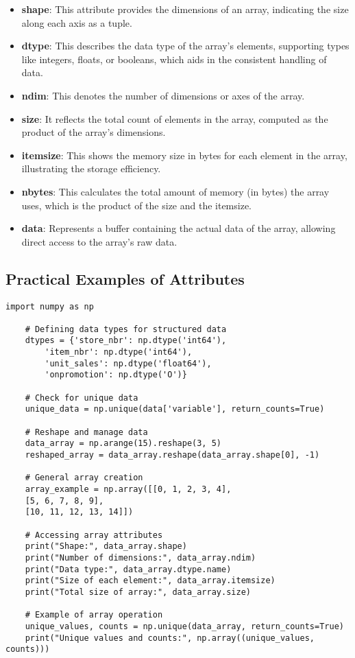 \begin{itemize}
	\item \textbf{shape}: This attribute provides the dimensions of an array, indicating the size along each axis as a tuple.
	\item \textbf{dtype}: This describes the data type of the array's elements, supporting types like integers, floats, or booleans, which aids in the consistent handling of data.
	\item \textbf{ndim}: This denotes the number of dimensions or axes of the array.
	\item \textbf{size}: It reflects the total count of elements in the array, computed as the product of the array's dimensions.
	\item \textbf{itemsize}: This shows the memory size in bytes for each element in the array, illustrating the storage efficiency.
	\item \textbf{nbytes}: This calculates the total amount of memory (in bytes) the array uses, which is the product of the size and the itemsize.
	\item \textbf{data}: Represents a buffer containing the actual data of the array, allowing direct access to the array's raw data.
\end{itemize}

\subsection{Practical Examples of Attributes}
\begin{lstlisting}[caption={Example code demonstrating NumPy array operations}, label={code:numpy-array-operations}, style=pythonstyle]
	import numpy as np
	
	# Defining data types for structured data
	dtypes = {'store_nbr': np.dtype('int64'),
		'item_nbr': np.dtype('int64'),
		'unit_sales': np.dtype('float64'),
		'onpromotion': np.dtype('O')}
	
	# Check for unique data
	unique_data = np.unique(data['variable'], return_counts=True)
	
	# Reshape and manage data
	data_array = np.arange(15).reshape(3, 5)
	reshaped_array = data_array.reshape(data_array.shape[0], -1)
	
	# General array creation
	array_example = np.array([[0, 1, 2, 3, 4],
	[5, 6, 7, 8, 9],
	[10, 11, 12, 13, 14]])
	
	# Accessing array attributes
	print("Shape:", data_array.shape)
	print("Number of dimensions:", data_array.ndim)
	print("Data type:", data_array.dtype.name)
	print("Size of each element:", data_array.itemsize)
	print("Total size of array:", data_array.size)
	
	# Example of array operation
	unique_values, counts = np.unique(data_array, return_counts=True)
	print("Unique values and counts:", np.array((unique_values, counts)))
\end{lstlisting}


